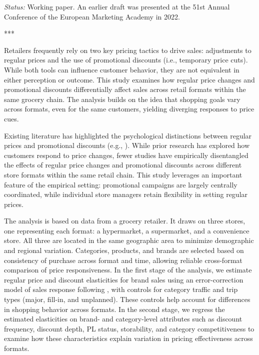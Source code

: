 \noindent
\textit{Status:} Working paper. An earlier draft was presented at the 51st Annual Conference of the European Marketing Academy in 2022.

\noindent
***

Retailers frequently rely on two key pricing tactics to drive sales: adjustments to regular prices and the use of promotional discounts (i.e., temporary price cuts). While both tools can influence customer behavior, they are not equivalent in either perception or outcome. This study examines how regular price changes and promotional discounts differentially affect sales across retail formats within the same grocery chain. The analysis builds on the idea that shopping goals vary across formats, even for the same customers, yielding diverging responses to price cues.

Existing literature has highlighted the psychological distinctions between regular prices and promotional discounts (e.g., \cite{DelVecchio2006-xp,Shankar1996-kq}). While prior research has explored how customers respond to price changes, fewer studies have empirically disentangled the effects of regular price changes and promotional discounts across different store formats within the same retail chain. This study leverages an important feature of the empirical setting: promotional campaigns are largely centrally coordinated, while individual store managers retain flexibility in setting regular prices.

The analysis is based on data from a grocery retailer. It draws on three stores, one representing each format: a hypermarket, a supermarket, and a convenience store. All three are located in the same geographic area to minimize demographic and regional variation. Categories, products, and brands are selected based on consistency of purchase across format and time, allowing reliable cross-format comparison of price responsiveness. In the first stage of the analysis, we estimate regular price and discount elasticities for brand sales using an error-correction model of sales response following \textcite{Pauwels2007-ky}, with controls for category traffic and trip types (major, fill-in, and unplanned). These controls help account for differences in shopping behavior across formats. In the second stage, we regress the estimated elasticities on brand- and category-level attributes such as discount frequency, discount depth, PL status, storability, and category competitiveness to examine how these characteristics explain variation in pricing effectiveness across formats.


